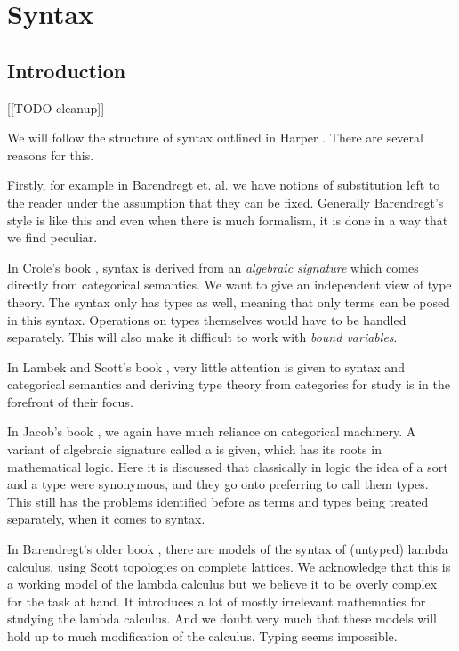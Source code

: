 \section{Syntax}

\subsection{Introduction}

[[TODO cleanup]]

We will follow the structure of syntax outlined in Harper \cite{harper_2016}. There are several reasons for this. 

Firstly, for example in Barendregt et. al. \cite{BarendregtHenk2013Lcwt} we have notions of substitution left to the reader under the assumption that they can be fixed. Generally Barendregt's style is like this and even when there is much formalism, it is done in a way that we find peculiar.

In Crole's book \cite{CroleRoyL1993Cft}, syntax is derived from an \textit{algebraic signature} which comes directly from categorical semantics. We want to give an independent view of type theory. The syntax only has types as well, meaning that only terms can be posed in this syntax. Operations on types themselves would have to be handled separately. This will also make it difficult to work with \textit{bound variables}.

In Lambek and Scott's book \cite{LambekJ1986Itho}, very little attention is given to syntax and categorical semantics and deriving type theory from categories for study is in the forefront of their focus.

In Jacob's book \cite{JacobsCLTT}, we again have much reliance on categorical machinery. A variant of algebraic signature called a  is given, which has its roots in mathematical logic. Here it is discussed that classically in logic the idea of a sort and a type were synonymous, and they go onto preferring to call them types. This still has the problems identified before as terms and types being treated separately, when it comes to syntax.

In Barendregt's older book \cite{barendregt1984lambda}, there are models of the syntax of (untyped) lambda calculus, using Scott topologies on complete lattices. We acknowledge that this is a working model of the lambda calculus but we believe it to be overly complex for the task at hand. It introduces a lot of mostly irrelevant mathematics for studying the lambda calculus. And we doubt very much that these models will hold up to much modification of the calculus. Typing seems impossible.

